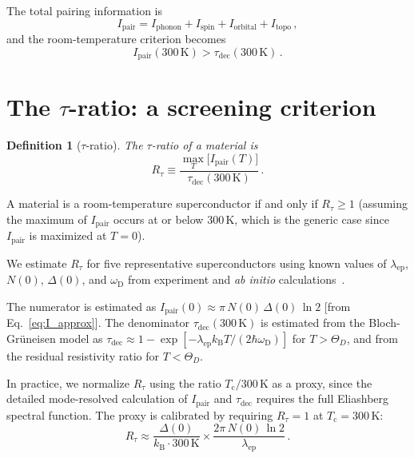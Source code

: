 \documentclass[prb,twocolumn,superscriptaddress,longbibliography,floatfix]{revtex4-2}
\newtheorem{definition}[theorem]{Definition}
\newcommand{\kB}{k_{\mathrm{B}}}
\newcommand{\tauasym}{\tau}
\newcommand{\taudec}{\tauasym_{\mathrm{dec}}}
\newcommand{\Ipair}{I_{\mathrm{pair}}}
\newcommand{\Rtau}{R_{\tauasym}}
\newcommand{\Tc}{T_{\mathrm{c}}}
\newcommand{\oD}{\omega_{\mathrm{D}}}
\begin{document}
The total pairing information is
\begin{equation}\label{eq:I_total_general}
  \Ipair = I_{\mathrm{phonon}} + I_{\mathrm{spin}}
  + I_{\mathrm{orbital}} + I_{\mathrm{topo}}\,,
\end{equation}
and the room-temperature criterion becomes
\begin{equation}\label{eq:RT_criterion}
  \Ipair(300\,\mathrm{K}) > \taudec(300\,\mathrm{K})\,.
\end{equation}

\section{The $\tauasym$-ratio: a screening criterion}
\label{sec:screening}

\begin{definition}[$\tauasym$-ratio]
\label{def:R_tau}
The $\tauasym$-ratio of a material is
\begin{equation}\label{eq:R_tau}
  \Rtau \equiv \frac{\max_T\bigl[\Ipair(T)\bigr]}
  {\taudec(300\,\mathrm{K})}\,.
\end{equation}
\end{definition}

A material is a room-temperature superconductor if and only if
$\Rtau \geq 1$ (assuming the maximum of $\Ipair$ occurs at or
below 300\,K, which is the generic case since $\Ipair$ is
maximized at $T = 0$).

We estimate $\Rtau$ for five representative superconductors
using known values of $\lambda_{\mathrm{ep}}$, $N(0)$, $\Delta(0)$,
and $\oD$ from experiment and \textit{ab initio}
calculations~\cite{Allen1975,Choi2002,Drozdov2015,Liu2017,Errea2020}.

The numerator is estimated as $\Ipair(0) \approx \pi\, N(0)\,
\Delta(0)\, \ln 2$ [from Eq.~\eqref{eq:I_approx}].  The
denominator $\taudec(300\,\mathrm{K})$ is estimated from the
Bloch-Gr\"uneisen model as $\taudec \approx 1 -
\exp[-\lambda_{\mathrm{ep}} \kB T / (2\hbar\oD)]$ for
$T > \Theta_D$, and from the residual resistivity ratio for
$T < \Theta_D$.

In practice, we normalize $\Rtau$ using the ratio
$\Tc / 300\,\mathrm{K}$ as a proxy, since the detailed
mode-resolved calculation of $\Ipair$ and $\taudec$ requires
the full Eliashberg spectral function.  The proxy is
calibrated by requiring $\Rtau = 1$ at $\Tc = 300\,$K:
\begin{equation}\label{eq:R_proxy}
  \Rtau \approx \frac{\Delta(0)}{\kB \cdot 300\,\mathrm{K}}
  \times \frac{2\pi\, N(0)\, \ln 2}
  {\lambda_{\mathrm{ep}}}\,.
\end{equation}
\end{document}
